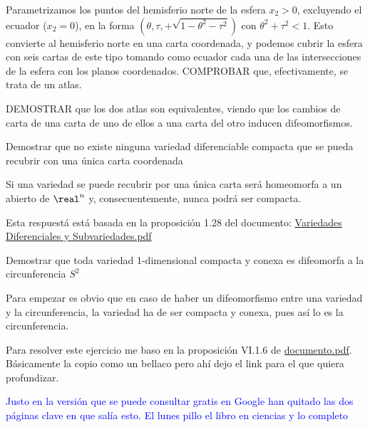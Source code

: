\begin{problem}[3]
Parametrizamos los puntos del hemisferio norte de la esfera $x_2 > 0$,
excluyendo el ecuador ($x_2 = 0$), en la forma $(θ, τ, + \sqrt{1 − θ^2 − τ^2})$ con
$θ^2 + τ^2 < 1$. Esto convierte al hemisferio norte en una carta coordenada, y podemos cubrir la esfera con seis cartas de este tipo tomando
como ecuador cada una de las intersecciones de la esfera con los planos
coordenados. COMPROBAR que, efectivamente, se trata de un atlas.

DEMOSTRAR que los dos atlas son equivalentes, viendo que los cambios
de carta de una carta de uno de ellos a una carta del otro inducen difeomorfismos.

\solution
\end{problem}

\begin{problem}[4]
Demostrar que no existe ninguna variedad diferenciable compacta que se pueda recubrir con una única carta coordenada
\solution


Si una variedad se puede recubrir por una única carta será homeomorfa a un abierto de $\real^n$ y, consecuentemente, nunca podrá ser compacta.

Esta respuestá está basada en la proposición 1.28 del documento: \href{http://ocw.um.es/ciencias/geometria-y-topologia/material-de-clase-1/01-variedadesdiferenciablessubvariedades-v100901.pdf}{Variedades Diferenciales y Subvariedades.pdf}
\end{problem}

\begin{problem}[5]
Demostrar que toda variedad 1-dimensional compacta y conexa es difeomorfa a la circunferencia $S^2$
\solution


Para empezar es obvio que en caso de haber un difeomorfismo entre una variedad y la circunferencia, la variedad ha de ser compacta y conexa, pues así lo es la circunferencia.

Para resolver este ejercicio me baso en la proposición VI.1.6 de \href{https://books.google.es/books?id=CAOjRFAMJFUC&pg=PA131&lpg=PA131&dq=variedad+1-dimensional&source=bl&ots=MLkMP7HMyo&sig=aLLSSaYknqPZhPsn-5jJM2MwPAc&hl=es&sa=X&ei=DeMeVZSOEczZPdLkgfgJ&ved=0CCcQ6AEwAQ#v=onepage&q&f=false}{documento.pdf}. Básicamente la copio como un bellaco pero ahí dejo el link para el que quiera profundizar.

\textcolor{blue}{Justo en la versión que se puede consultar gratis en Google han quitado las dos páginas clave en que salía esto. El lunes pillo el libro en ciencias y lo completo}

\end{problem}

